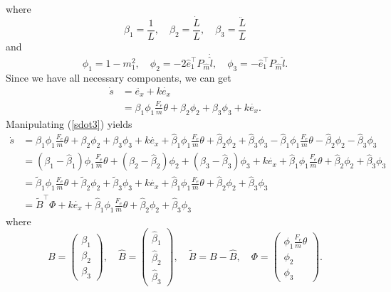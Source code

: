 where
\begin{equation}
\beta_1=\frac{1}{L},\quad \beta_2=\frac{\dot{L}}{L}, \quad \beta_3=\frac{\ddot{L}}{L}
\end{equation}
and
\begin{equation}
\phi_1=1-m_1^2,\quad \phi_2=-2\hat{e}_1^{\top}P_{\hat{m}}\dot{\hat{l}}, \quad \phi_3=-\hat{e}_1^{\top}P_{\hat{m}}\hat{l}.
\end{equation}
Since we have all necessary components, we can get 
\begin{align}
\dot{s}&=\ddot{e_x}+k\dot{e_x}
\\&=\beta_1\phi_1\frac{F_e}{m}\theta+\beta_2\phi_2+\beta_3\phi_3+k\dot{e_x}.
\label{sdot3}
\end{align}
Manipulating (\ref{sdot3}) yields
\begin{align}
\dot{s}&=\beta_1\phi_1\frac{F_e}{m}\theta+\beta_2\phi_2+\beta_3\phi_3+k\dot{e_x}+\hat{\beta}_1\phi_1\frac{F_e}{m}\theta+\hat{\beta}_2\phi_2+\hat{\beta}_3\phi_3-\hat{\beta}_1\phi_1\frac{F_e}{m}\theta-\hat{\beta}_2\phi_2-\hat{\beta}_3\phi_3
\\&=(\beta_1-\hat{\beta}_1)\phi_1\frac{F_e}{m}\theta+(\beta_2-\hat{\beta}_2)\phi_2+(\beta_3-\hat{\beta}_3)\phi_3+k\dot{e_x}+\hat{\beta}_1\phi_1\frac{F_e}{m}\theta+\hat{\beta}_2\phi_2+\hat{\beta}_3\phi_3
\\&=\tilde{\beta}_1\phi_1\frac{F_e}{m}\theta+\tilde{\beta}_2\phi_2+\tilde{\beta}_3\phi_3+k\dot{e_x}+\hat{\beta}_1\phi_1\frac{F_e}{m}\theta+\hat{\beta}_2\phi_2+\hat{\beta}_3\phi_3
\\&=\tilde{B}^\top\Phi+k\dot{e_x}+\hat{\beta}_1\phi_1\frac{F_e}{m}\theta+\hat{\beta}_2\phi_2+\hat{\beta}_3\phi_3
\end{align}
where 
\begin{equation}
B=\begin{pmatrix}
\beta_1 \\ \beta_2 \\ \beta_3
\end{pmatrix}, \quad
\hat{B}=\begin{pmatrix} \hat{\beta}_1 \\ \hat{\beta}_2 \\ \hat{\beta}_3 \end{pmatrix}, \quad
\tilde{B}=B-\hat{B}, \quad 
\Phi=\begin{pmatrix} \phi_1\frac{F_e}{m}\theta \\ \phi_2 \\ \phi_3 \end{pmatrix}.
\end{equation}
